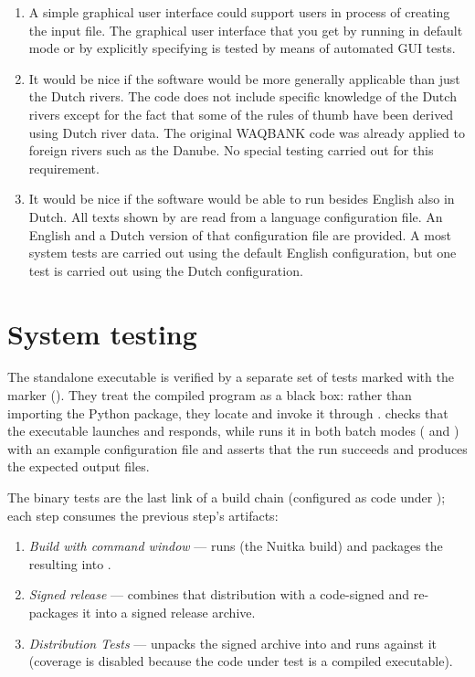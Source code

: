\begin{enumerate}
\item A simple graphical user interface could support users in process of creating the input file.
The graphical user interface that you get by running \dfastbe in default mode or by explicitly specifying  is tested by means of automated GUI tests.

\item It would be nice if the software would be more generally applicable than just the Dutch rivers.
The code does not include specific knowledge of the Dutch rivers except for the fact that some of the rules of thumb have been derived using Dutch river data.
The original WAQBANK code was already applied to foreign rivers such as the Danube.
No special testing carried out for this requirement.

\item It would be nice if the software would be able to run besides English also in Dutch.
All texts shown by \dfastbe are read from a language configuration file.
An English and a Dutch version of that configuration file are provided.
A most system tests are carried out using the default English configuration, but one test is carried out using the Dutch configuration.
\end{enumerate}

\section{System testing}

The standalone executable is verified by a separate set of tests marked with the 
marker (). They treat the compiled program as a black box: rather than
importing the Python package, they locate  and invoke it through
.  checks that the executable launches and responds, while
 runs it in both batch modes ( and
) with an example configuration file and asserts that the run succeeds and
produces the expected output files.


The binary tests are the last link of a build chain (configured as code under
); each step consumes the previous step's artifacts:

\begin{enumerate}
\item \emph{Build with command window} --- runs  (the Nuitka
build) and packages the resulting  into .
\item \emph{Signed release} --- combines that distribution with a code-signed  and
re-packages it into a signed release archive.
\item \emph{Distribution Tests} --- unpacks the signed archive into  and runs
 against it (coverage is disabled because
the code under test is a compiled executable).
\end{enumerate}

